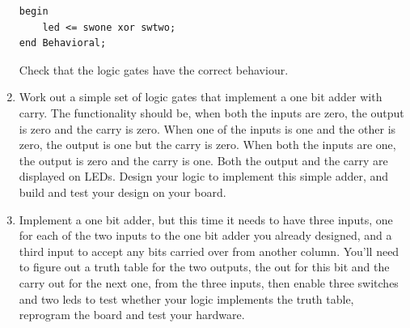 \documentclass[../physical_computing.tex]{subfiles}
\begin{document}
\begin{enumerate}
\begin{verbatim}
begin
    led <= swone xor swtwo;
end Behavioral;
\end{verbatim}
Check that the logic gates have the correct behaviour.
\item 
Work out a simple set of logic gates that implement a one bit adder with carry. The functionality should be, when both the inputs are zero, the output is zero and the carry is zero. When one of the inputs is one and the other is zero, the output is one but the carry is zero. When both the inputs are one, the output is zero and the carry is one. Both the output and the carry are displayed on LEDs. Design your logic to implement this simple adder, and build and test your design on your board.
\item 
Implement a one bit adder, but this time it needs to have three inputs, one for each of the two inputs to the one bit adder you already designed, and a third input to accept any bits carried over from another column. You'll need to figure out a truth table for the two outputs, the out for this bit and the carry out for the next one, from the three inputs, then enable three switches and two leds to test whether your logic implements the truth table, reprogram the board and test your hardware.
\end{enumerate}
\end{document}
